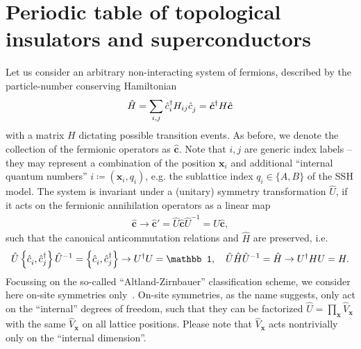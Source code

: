 \section{Periodic table of topological insulators and superconductors}
\label{sec:Periodic_table_of_topological_insulators_and_superconductors}
%
%
Let us consider an arbitrary non-interacting system of fermions, described by the particle-number conserving Hamiltonian
\begin{align}
    \hat H = \sum_{i,j}\hat c^\dag_{i}H_{ij}\hat c^\pdag_j = \hat{\bm c}^\dag H \hat{\bm c}^\pdag
\end{align}
with a matrix $H$ dictating possible transition events.
As before, we denote the collection of the fermionic operators as $\hat{\bm c}$.
Note that $i,j$ are generic index labels -- they may represent a combination of the position $\bm x_i$ and additional ``internal quantum numbers'' $i\coloneqq(\bm x_i,q_i)$, e.g. the sublattice index $q_i\in \{A,B\}$ of the SSH model.
The system is invariant under a (unitary) symmetry transformation $\hat U$, if it acts on the fermionic annihilation operators as a linear map
\begin{align}
    \hat{\bm c}\rightarrow \hat{\bm c}' = \hat U \hat{\bm c} \hat U^{-1} = U \hat{\bm c},
\end{align}
such that the canonical anticommutation relations and $\hat H$ are preserved, i.e.
\begin{align}
    \hat U\anticommutator{\hat c_i^\pdag,\hat c_j^\dag}\hat U^{-1}
    =
    \anticommutator{\hat c_i^\pdag,\hat c_j^\dag}
    \rightarrow
    U^\dag U = \mathbb1
    ,\quad
    \hat U \hat H \hat U^{-1} = \hat H
    \rightarrow
    U^\dag H U = H
    .
\end{align}
Focussing on the so-called ``Altland-Zirnbauer'' classification scheme, we consider here on-site symmetries only~\cite{Altland1997}.
On-site symmetries, as the name suggests, only act on the ``internal'' degrees of freedom, such that they can be factorized $\hat U=\prod_{\bm x}\hat V_{\bm x}$ with the same $\hat V_{\bm x}$ on all lattice positions.
Please note that $\hat V_{\bm x}$ acts nontrivially only on the ``internal dimension''.

